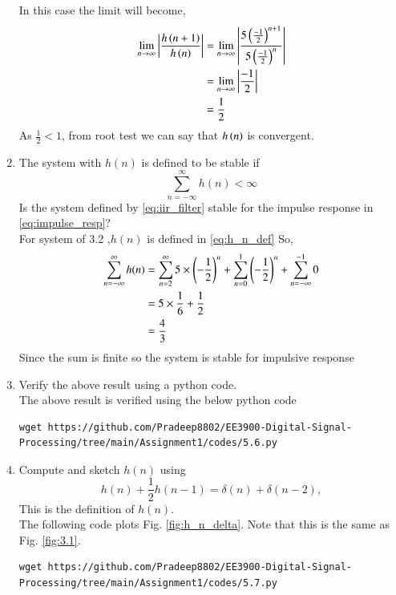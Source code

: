 \documentclass[journal,12pt,twocolumn]{IEEEtran}
\renewcommand\thesection{\arabic{section}}
\begin{document}
\begin{enumerate}[label=\thesection.\arabic*]
In this case the limit will become,
\begin{align}
	\lim_{n \rightarrow \infty}\left\vert\frac{h\left(n+1\right)}{h\left(n\right)}\right\vert &= \lim_{n \rightarrow \infty}\left\vert\frac{5\left(\frac{-1}{2}\right)^{n+1}}{5\left(\frac{-1}{2}\right)^{n}}\right\vert \\
	&= \lim_{n \rightarrow \infty}\left\vert\frac{-1}{2}\right\vert\\
	&= \frac{1}{2}
\end{align}
As $\frac{1}{2} < 1$, from root test we can say that $h\left(n\right)$ is convergent.
	\item The system with $h(n)$ is defined to be stable if
	\begin{equation}
		\sum_{n=-\infty}^{\infty}h(n) < \infty
	\end{equation}
	Is the system defined by \eqref{eq:iir_filter} stable for the impulse response in \eqref{eq:impulse_resp}?\\
	\solution For system of 3.2 ,$h(n)$ is defined in \eqref{eq:h_n_def} 
	So,
	\begin{align}
		\sum_{n=-\infty}^{\infty}h(n)&=\sum_{n=2}^{\infty}5\times \left(-\frac{1}{2}\right)^n+\sum_{n=0}^{1} \left(-\frac{1}{2}\right)^n+\sum_{n=-\infty}^{-1}0\\
		&=5\times \frac{1}{6}+\frac{1}{2}\\
		&=\frac{4}{3}
	\end{align}
	Since the sum is finite so the system is stable for impulsive response
	\item Verify the above result using a python code.\\
	\solution The above result is verified using the below python code
		\begin{lstlisting}
wget https://github.com/Pradeep8802/EE3900-Digital-Signal-Processing/tree/main/Assignment1/codes/5.6.py
	\end{lstlisting}
	\item 
	Compute and sketch $h(n)$ using 
	\begin{equation}
		\label{eq:iir_filter_h}
		h(n) + \frac{1}{2}h(n-1) = \delta(n) + \delta(n-2), 
	\end{equation}
	This is the definition of $h(n)$.
	\\
	\solution The following code plots Fig. \ref{fig:h_n_delta}. Note that this is the same as Fig. 
	\ref{fig:3.1}. 
	\begin{lstlisting}
wget https://github.com/Pradeep8802/EE3900-Digital-Signal-Processing/tree/main/Assignment1/codes/5.7.py
	\end{lstlisting}
	\begin{figure}[!ht]

\end{figure}
\end{enumerate}
\end{document}

